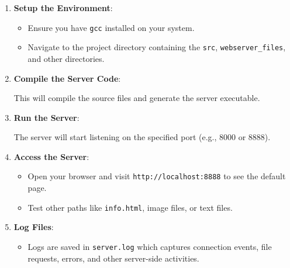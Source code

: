 \begin{enumerate}
\def\labelenumi{\arabic{enumi}.}
\item
  \textbf{Setup the Environment}:

  \begin{itemize}
  \tightlist
  \item
    Ensure you have \texttt{gcc} installed on your system.
  \item
    Navigate to the project directory containing the \texttt{src},
    \texttt{webserver\_files}, and other directories.
  \end{itemize}
\item
  \textbf{Compile the Server Code}:

\begin{Shaded}
\begin{Highlighting}[]
\end{Highlighting}
\end{Shaded}

  This will compile the source files and generate the server executable.
\item
  \textbf{Run the Server}:

\begin{Shaded}
\begin{Highlighting}[]
\end{Highlighting}
\end{Shaded}

  The server will start listening on the specified port (e.g., 8000 or
  8888).
\item
  \textbf{Access the Server}:

  \begin{itemize}
  \tightlist
  \item
    Open your browser and visit \texttt{http://localhost:8888} to see
    the default page.
  \item
    Test other paths like \texttt{info.html}, image files, or text
    files.
  \end{itemize}
\item
  \textbf{Log Files}:

  \begin{itemize}
  \tightlist
  \item
    Logs are saved in \texttt{server.log} which captures connection
    events, file requests, errors, and other server-side activities.
  \end{itemize}
\end{enumerate}

